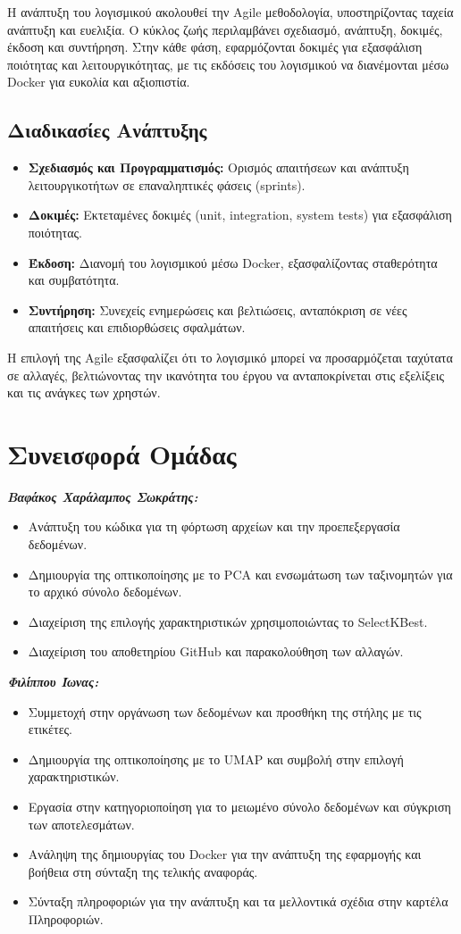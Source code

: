 \documentclass[a4paper,12pt]{article}
\begin{document}
Η ανάπτυξη του λογισμικού ακολουθεί την Agile μεθοδολογία, υποστηρίζοντας ταχεία ανάπτυξη και ευελιξία. Ο κύκλος ζωής περιλαμβάνει σχεδιασμό, ανάπτυξη, δοκιμές, έκδοση και συντήρηση. Στην κάθε φάση, εφαρμόζονται δοκιμές για εξασφάλιση ποιότητας και λειτουργικότητας, με τις εκδόσεις του λογισμικού να διανέμονται μέσω Docker για ευκολία και αξιοπιστία.

\subsection{Διαδικασίες Ανάπτυξης}

\begin{itemize}
    \item \textbf{Σχεδιασμός και Προγραμματισμός:} Ορισμός απαιτήσεων και ανάπτυξη λειτουργικοτήτων σε επαναληπτικές φάσεις (sprints).
    \item \textbf{Δοκιμές:} Εκτεταμένες δοκιμές (unit, integration, system tests) για εξασφάλιση ποιότητας.
    \item \textbf{Έκδοση:} Διανομή του λογισμικού μέσω Docker, εξασφαλίζοντας σταθερότητα και συμβατότητα.
    \item \textbf{Συντήρηση:} Συνεχείς ενημερώσεις και βελτιώσεις, ανταπόκριση σε νέες απαιτήσεις και επιδιορθώσεις σφαλμάτων.
\end{itemize}

Η επιλογή της Agile εξασφαλίζει ότι το λογισμικό μπορεί να προσαρμόζεται ταχύτατα σε αλλαγές, βελτιώνοντας την ικανότητα του έργου να ανταποκρίνεται στις εξελίξεις και τις ανάγκες των χρηστών.

\newpage

\section{Συνεισφορά Ομάδας}
\textbf{\textit{Βαφάκος Χαράλαμπος Σωκράτης:}}
\begin{itemize}
    \item Ανάπτυξη του κώδικα για τη φόρτωση αρχείων και την προεπεξεργασία δεδομένων.
    \item Δημιουργία της οπτικοποίησης με το PCA και ενσωμάτωση των ταξινομητών για το αρχικό σύνολο δεδομένων.
    \item Διαχείριση της επιλογής χαρακτηριστικών χρησιμοποιώντας το SelectKBest.
    \item Διαχείριση του αποθετηρίου GitHub και παρακολούθηση των αλλαγών.
\end{itemize}
\textbf{\textit{Φιλίππου Ίωνας:}}
\begin{itemize}
\item Συμμετοχή στην οργάνωση των δεδομένων και προσθήκη της στήλης με τις ετικέτες.
\item Δημιουργία της οπτικοποίησης με το UMAP και συμβολή στην επιλογή χαρακτηριστικών.
\item Εργασία στην κατηγοριοποίηση για το μειωμένο σύνολο δεδομένων και σύγκριση των αποτελεσμάτων.
\item Ανάληψη της δημιουργίας του Docker για την ανάπτυξη της εφαρμογής και βοήθεια στη σύνταξη της τελικής αναφοράς.
\item Σύνταξη πληροφοριών για την ανάπτυξη και τα μελλοντικά σχέδια στην καρτέλα Πληροφοριών.
\end{itemize}
\end{document}

